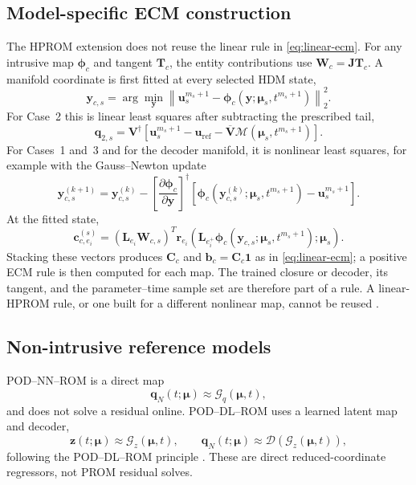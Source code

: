 \documentclass[11pt]{article}
\newcommand{\q}{\mathbf q}
\newcommand{\qp}{\q}
\newcommand{\uvec}{\mathbf u}
\newcommand{\mub}{\bm\mu}
\newcommand{\z}{\mathbf z}
\newcommand{\norm}[1]{\left\lVert #1 \right\rVert}
\begin{document}
\subsection{Model-specific ECM construction}
\label{sec:nonlinear-ecm}
The HPROM extension does not reuse the linear rule in \eqref{eq:linear-ecm}.
For any intrusive map $\boldsymbol\phi_c$ and tangent $\mathbf T_c$, the
entity contributions use $\mathbf W_c=\mathbf J\mathbf T_c$.  A manifold
coordinate is first fitted at every selected HDM state,
\begin{equation}
\mathbf y_{c,s}=\arg\min_{\mathbf y}\norm{\uvec_s^{m_s+1}-
\boldsymbol\phi_c(\mathbf y;\mub_s,t^{m_s+1})}_2^2.
\label{eq:nonlinear-manifold-fit}
\end{equation}
For Case~2 this is linear least squares after subtracting the prescribed tail,
\begin{equation}
{\qp}_{2,s}=\mathbf V^\dagger\left[
\uvec_s^{m_s+1}-\uvec_{\mathrm{ref}}-
\overline{\mathbf V}\mathcal M(\mub_s,t^{m_s+1})\right].
\label{eq:case2-ecm-fit}
\end{equation}
For Cases~1 and~3 and for the decoder manifold, it is nonlinear least
squares, for example with the Gauss--Newton update
\begin{equation}
\mathbf y_{c,s}^{(k+1)}=\mathbf y_{c,s}^{(k)}-
\left[\frac{\partial\boldsymbol\phi_c}{\partial\mathbf y}\right]^\dagger
\left[\boldsymbol\phi_c(\mathbf y_{c,s}^{(k)};\mub_s,t^{m_s+1})-
\uvec_s^{m_s+1}\right].
\label{eq:nonlinear-manifold-fit-gn}
\end{equation}
At the fitted state,
\begin{equation}
\mathbf c_{c,e_i}^{(s)}=(\mathbf L_{e_i}\mathbf W_{c,s})^T
\mathbf r_{e_i}(\mathbf L_{e_i^+}
\boldsymbol\phi_c(\mathbf y_{c,s};\mub_s,t^{m_s+1});\mub_s).
\label{eq:nonlinear-ecm-contribution}
\end{equation}
Stacking these vectors produces $\mathbf C_c$ and
$\mathbf b_c=\mathbf C_c\mathbf1$ as in \eqref{eq:linear-ecm}; a positive
ECM rule is then computed for each map.  The trained closure or decoder, its
tangent, and the parameter--time sample set are therefore part of a rule.  A
linear-HPROM rule, or one built for a different nonlinear map, cannot be
reused \cite{hernandez2017dimensional,hernandez2020multiscale,de2023hyper}.

\subsection{Non-intrusive reference models}
POD--NN--ROM is a direct map
\begin{equation}
\q_N(t;\mub)\approx\mathcal G_q(\mub,t),
\label{eq:podnn}
\end{equation}
and does not solve a residual online.  POD--DL--ROM uses a learned latent map
and decoder,
\begin{equation}
\z(t;\mub)\approx\mathcal G_z(\mub,t),\qquad
\q_N(t;\mub)\approx\mathcal D(\mathcal G_z(\mub,t)),
\label{eq:poddl}
\end{equation}
following the POD--DL--ROM principle \cite{fresca2022pod}.  These are direct
reduced-coordinate regressors, not PROM residual solves.
\end{document}
